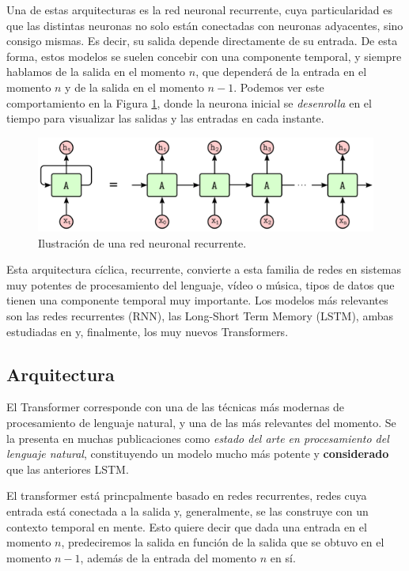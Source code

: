 Una de estas arquitecturas es la red neuronal recurrente, cuya particularidad es que las distintas neuronas no solo están conectadas con neuronas adyacentes, sino consigo mismas. Es decir, su salida depende directamente de su entrada. De esta forma, estos modelos se suelen concebir con una componente temporal, y siempre hablamos de la salida en el momento $n$, que dependerá de la entrada en el momento $n$ y de la salida en el momento $n - 1$. Podemos ver este comportamiento en la Figura \ref{fig:rnn-unrolled}, donde la neurona inicial se \textit{desenrolla} en el tiempo para visualizar las salidas y las entradas en cada instante.


\begin{figure}[h]
    \centering
    \includegraphics[width=.9\textwidth]{media/rnn-graph.pdf}
    \caption{Ilustración de una red neuronal recurrente.}
    \label{fig:rnn-unrolled}
\end{figure}


Esta arquitectura cíclica, recurrente, convierte a esta familia de redes en sistemas muy potentes de procesamiento del lenguaje, vídeo o música, tipos de datos que tienen una componente temporal muy importante. Los modelos más relevantes son las redes recurrentes (RNN), las Long-Short Term Memory (LSTM), ambas estudiadas en \cite{sherstinsky2018fundamentals} y, finalmente, los muy nuevos Transformers.


\subsection{Arquitectura}
El Transformer corresponde con una de las técnicas más modernas de procesamiento de lenguaje natural, y una de las más relevantes del momento. Se la presenta en muchas publicaciones como \textit{estado del arte en procesamiento del lenguaje natural}, constituyendo un modelo mucho más potente y \textbf{considerado} que las anteriores LSTM.

El transformer está princpalmente basado en redes recurrentes, redes cuya entrada está conectada a la salida y, generalmente, se las construye con un contexto temporal en mente. Esto quiere decir que dada una entrada en el momento $n$, predeciremos la salida en función de la salida que se obtuvo en el momento $n - 1$, además de la entrada del momento $n$ en sí.

